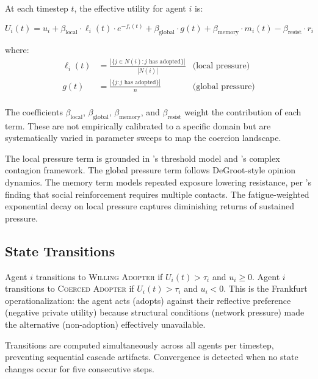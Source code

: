 \documentclass[11pt, a4paper]{article}
\newcommand{\betalocal}{\beta_{\text{local}}}
\newcommand{\betaglobal}{\beta_{\text{global}}}
\newcommand{\betamemory}{\beta_{\text{memory}}}
\newcommand{\betaresist}{\beta_{\text{resist}}}
\begin{document}
At each timestep $t$, the effective utility for agent $i$ is:

\begin{equation}
    U_i(t) = u_i + \betalocal \cdot \ell_i(t) \cdot e^{-f_i(t)} + \betaglobal \cdot g(t) + \betamemory \cdot m_i(t) - \betaresist \cdot r_i
    \label{eq:utility}
\end{equation}

\noindent where:
\begin{align*}
    \ell_i(t) &= \frac{|\{j \in N(i) : j \text{ has adopted}\}|}{|N(i)|} & \text{(local pressure)} \\
    g(t) &= \frac{|\{j : j \text{ has adopted}\}|}{n} & \text{(global pressure)} \\
\end{align*}

The coefficients $\betalocal$, $\betaglobal$, $\betamemory$, and $\betaresist$ weight the contribution of each term. These are not empirically calibrated to a specific domain but are systematically varied in parameter sweeps to map the coercion landscape.

The local pressure term is grounded in \citeauthor{granovetter1978threshold}'s threshold model and \citeauthor{centola2007complex}'s complex contagion framework. The global pressure term follows DeGroot-style opinion dynamics. The memory term models repeated exposure lowering resistance, per \citeauthor{centola2010spread}'s finding that social reinforcement requires multiple contacts. The fatigue-weighted exponential decay on local pressure captures diminishing returns of sustained pressure.

\subsection{State Transitions}

Agent $i$ transitions to \textsc{Willing Adopter} if $U_i(t) > \tau_i$ and $u_i \geq 0$. Agent $i$ transitions to \textsc{Coerced Adopter} if $U_i(t) > \tau_i$ and $u_i < 0$. This is the Frankfurt operationalization: the agent acts (adopts) against their reflective preference (negative private utility) because structural conditions (network pressure) made the alternative (non-adoption) effectively unavailable.

Transitions are computed simultaneously across all agents per timestep, preventing sequential cascade artifacts. Convergence is detected when no state changes occur for five consecutive steps.
\end{document}
